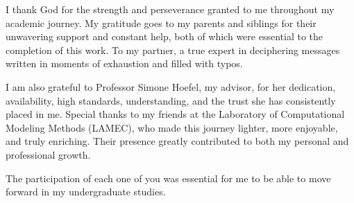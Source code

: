 \begin{agradecimentos}

\vspace{-0.75cm}








I thank God for the strength and perseverance granted to me throughout my academic journey.
My gratitude goes to my parents and siblings for their unwavering support and constant help, both of which were essential to the completion of this work.
To my partner, a true expert in deciphering messages written in moments of exhaustion and filled with typos. %

I am also grateful to Professor Simone Hoefel, my advisor, for her dedication, availability, high standards, understanding, and the trust she has consistently placed in me.
Special thanks to my friends at the Laboratory of Computational Modeling Methods (LAMEC), who made this journey lighter, more enjoyable, and truly enriching. Their presence greatly contributed to both my personal and professional growth.

The participation of each one of you was essential for me to be able to move forward in my undergraduate studies.


\end{agradecimentos}
\newpage

